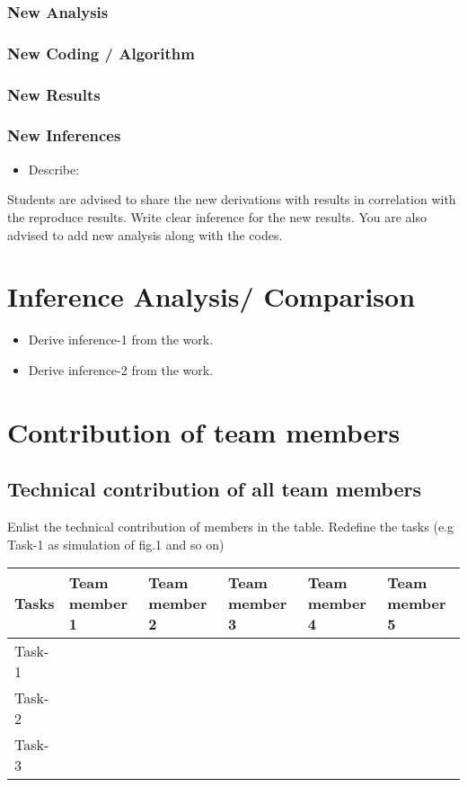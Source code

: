 \documentclass{article}
\begin{document}
\subsubsection{New Analysis}

\subsubsection{New Coding / Algorithm}

\subsubsection{New Results}

\subsubsection{New Inferences}
\begin{itemize}
    \item Describe:
\end{itemize}

Students are advised to share the new derivations with results in correlation with the  reproduce results. Write clear inference for the new results. You are also advised to add new analysis along with the codes.


\section{Inference Analysis/ Comparison}

\begin{itemize}

\item Derive inference-1 from the work.

\item Derive inference-2 from the work.
\end{itemize}

\section{ Contribution of team members}
\subsection{Technical contribution of all team members }
Enlist the technical contribution of members in the table. Redefine the tasks (e.g Task-1 as simulation of fig.1 and so on)
\begin{table}[h]
\centering
\begin{tabular}{|l|l|l|l|l|l|}
\hline
Tasks  & Team member 1 & Team member 2 & Team member 3 & Team member 4 & Team member 5 \\ \hline
Task-1 &               &               &               &               &               \\ \hline
Task-2 &               &               &               &               &               \\ \hline
Task-3 &               &               &               &               &               \\ \hline
\end{tabular}
\end{table}
\end{document}
